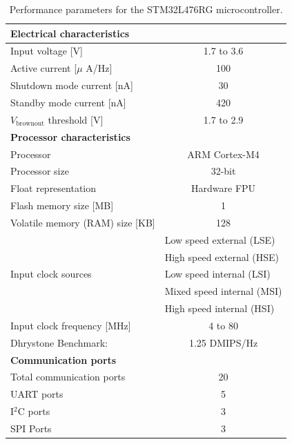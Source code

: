 \begin{table}[H]
	\centering
	\caption{Performance parameters for the STM32L476RG microcontroller. }
	\setlength{\extrarowheight}{5pt}
	\begin{tabular}{l  c}
		\hline
		\multicolumn{2}{l}{\textbf{Electrical characteristics}}\\
		\hline
		\hline
		Input voltage [V]    & 1.7 to 3.6\\
		\hline
		Active current [$\mu$ A/Hz]    & 100 \\
		\hline
		Shutdown mode current [nA]  &  30 \\
		\hline
		Standby mode current [nA] &  420 \\
		\hline
		$V_{\text{brownout}}$ threshold [V] &  1.7 to 2.9\\
		\hline
		\hline
		\multicolumn{2}{l}{\textbf{Processor characteristics}}\\
		\hline
		\hline
		Processor   &  ARM Cortex-M4 \\
		\hline
		Processor size   & 32-bit\\
		\hline
		Float representation & Hardware FPU \\
		\hline
		Flash memory size [MB] & 1\\
		\hline
		Volatile memory (RAM) size [KB] & 128\\
		\hline
		\multirow{5}{*}{Input clock sources } & \multicolumn{1}{l}{Low speed external (LSE)}\\&  \multicolumn{1}{l}{High speed external (HSE)}\\ &  \multicolumn{1}{l}{Low speed internal (LSI)}\\ &  \multicolumn{1}{l}{Mixed speed internal (MSI)}\\ &  \multicolumn{1}{l}{High speed internal (HSI)} \\
		\hline
		Input clock frequency [MHz] & 4 to 80 \\
		\hline
		Dhrystone Benchmark: & 1.25 DMIPS/Hz \\
		\hline
		\hline
		\multicolumn{2}{l}{\textbf{Communication ports}} \\
		\hline
		\hline
		Total communication ports & 20 \\
		\hline
		UART ports & 5 \\
		\hline
		I$^2$C ports & 3 \\
		\hline
		SPI Ports & 3 \\
		\hline
		\hline
	\end{tabular}
	
	\label{tab:stm_spec}
\end{table}

